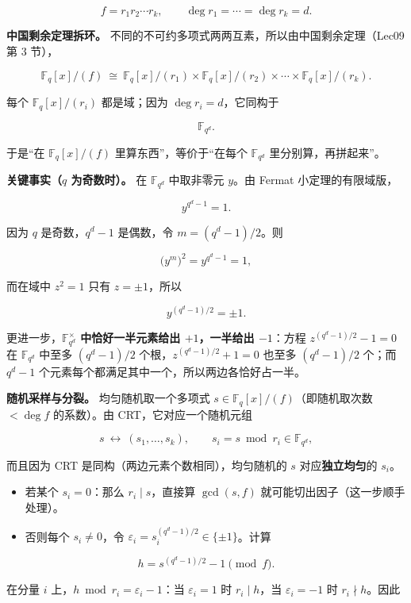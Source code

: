 \[
f=r_1r_2\cdots r_k,\qquad \deg r_1=\cdots=\deg r_k=d .
\]

\textbf{中国剩余定理拆环。} 不同的不可约多项式两两互素，所以由中国剩余定理（Lec09 第 3 节），

\[
\mathbb F_q[x]/(f)\ \cong\ \mathbb F_q[x]/(r_1)\times\mathbb F_q[x]/(r_2)\times\cdots\times\mathbb F_q[x]/(r_k).
\]

每个 $\mathbb F_q[x]/(r_i)$ 都是域；因为 $\deg r_i=d$，它同构于

\[
\mathbb F_{q^d}.
\]

于是“在 $\mathbb F_q[x]/(f)$ 里算东西”，等价于“在每个 $\mathbb F_{q^d}$ 里分别算，再拼起来”。

\textbf{关键事实（$q$ 为奇数时）。} 在 $\mathbb F_{q^d}$ 中取非零元 $y$。由 Fermat 小定理的有限域版，

\[
y^{q^d-1}=1 .
\]

因为 $q$ 是奇数，$q^d-1$ 是偶数，令 $m=(q^d-1)/2$。则

\[
\bigl(y^{m}\bigr)^2=y^{q^d-1}=1,
\]

而在域中 $z^2=1$ 只有 $z=\pm1$，所以

\[
y^{(q^d-1)/2}=\pm1 .
\]

更进一步，\textbf{$\mathbb F_{q^d}^\times$ 中恰好一半元素给出 $+1$，一半给出 $-1$}：方程 $z^{(q^d-1)/2}-1=0$ 在 $\mathbb F_{q^d}$ 中至多 $(q^d-1)/2$ 个根，$z^{(q^d-1)/2}+1=0$ 也至多 $(q^d-1)/2$ 个；而 $q^d-1$ 个元素每个都满足其中一个，所以两边各恰好占一半。

\textbf{随机采样与分裂。} 均匀随机取一个多项式 $s\in\mathbb F_q[x]/(f)$（即随机取次数 $<\deg f$ 的系数）。由 CRT，它对应一个随机元组

\[
s\ \longleftrightarrow\ (s_1,\dots,s_k),\qquad s_i=s\bmod r_i\in\mathbb F_{q^d},
\]

而且因为 CRT 是同构（两边元素个数相同），均匀随机的 $s$ 对应\textbf{独立均匀}的 $s_i$。

\begin{itemize}
\item 若某个 $s_i=0$：那么 $r_i\mid s$，直接算 $\gcd(s,f)$ 就可能切出因子（这一步顺手处理）。
\item 否则每个 $s_i\ne0$，令 $\varepsilon_i=s_i^{(q^d-1)/2}\in\{\pm1\}$。计算
\end{itemize}


\[
h=s^{(q^d-1)/2}-1\pmod f .
\]

在分量 $i$ 上，$h\bmod r_i=\varepsilon_i-1$：当 $\varepsilon_i=1$ 时 $r_i\mid h$，当 $\varepsilon_i=-1$ 时 $r_i\nmid h$。因此

